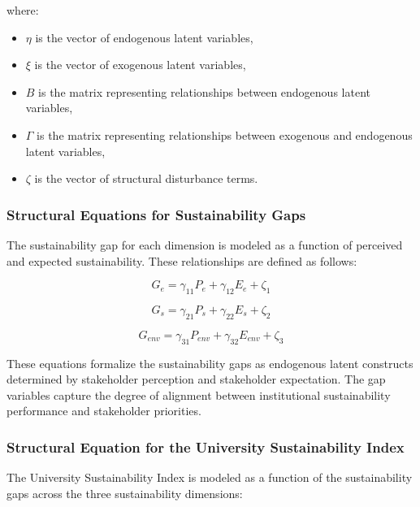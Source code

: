 \documentclass[11pt,a4paper]{article}
\begin{document}
where:

\begin{itemize}
\item $\eta$ is the vector of endogenous latent variables,
\item $\xi$ is the vector of exogenous latent variables,
\item $B$ is the matrix representing relationships between endogenous latent variables,
\item $\Gamma$ is the matrix representing relationships between exogenous and endogenous latent variables,
\item $\zeta$ is the vector of structural disturbance terms.
\end{itemize}

\subsubsection{Structural Equations for Sustainability Gaps}

The sustainability gap for each dimension is modeled as a function of perceived and expected sustainability. These relationships are defined as follows:

\begin{equation}
G_e = \gamma_{11} P_e + \gamma_{12} E_e + \zeta_1
\end{equation}

\begin{equation}
G_s = \gamma_{21} P_s + \gamma_{22} E_s + \zeta_2
\end{equation}

\begin{equation}
G_{env} = \gamma_{31} P_{env} + \gamma_{32} E_{env} + \zeta_3
\end{equation}

These equations formalize the sustainability gaps as endogenous latent constructs determined by stakeholder perception and stakeholder expectation. The gap variables capture the degree of alignment between institutional sustainability performance and stakeholder priorities.

\subsubsection{Structural Equation for the University Sustainability Index}

The University Sustainability Index is modeled as a function of the sustainability gaps across the three sustainability dimensions:
\end{document}
